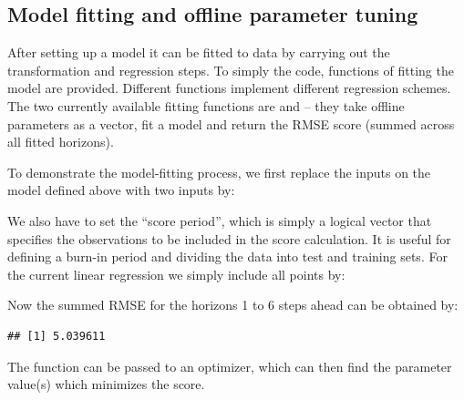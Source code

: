 \subsection{Model fitting and offline parameter tuning}

After setting up a model it can be fitted to data by carrying out the
transformation and regression steps. To simply the code, functions of fitting
the model are provided. Different functions implement different regression
schemes. The two currently available fitting functions are
 and  -- they take offline parameters as a
vector, fit a model and return the RMSE score (summed across all fitted horizons).

\noindent To demonstrate the model-fitting process, we first replace the inputs
on the model defined above with two inputs by:
\begin{knitrout}
\color{fgcolor}\begin{kframe}
\begin{alltt}
\hlopt{\$} \hlkwb{<-} 
\hlopt{\$}\hlstd{(} \hlstd{=} \hlstd{,}
                  \hlstd{=} \hlstd{)}
\end{alltt}
\end{kframe}
\end{knitrout}
\noindent We also have to set the ``score period'', which is simply a logical vector that
specifies the observations to be included in the score calculation. It is
useful for defining a burn-in period and dividing the data into test and training sets. For
the current linear regression we simply include all points by:
\begin{knitrout}
\color{fgcolor}\begin{kframe}
\begin{alltt}
\hlopt{\$} \hlkwb{<-} \hlstd{(}\hlstd{,} \hlopt{\$}
\end{alltt}
\end{kframe}
\end{knitrout}
\noindent Now the summed RMSE for the horizons 1 to 6 steps ahead can be
obtained by:
\begin{knitrout}
\color{fgcolor}\begin{kframe}
\begin{alltt}
\hlopt{\$} \hlkwb{<-} \hlopt{:}
\hlstd{(}\hlstd{(}\hlstd{=}  \hlstd{=}\hlstd{)}
\end{alltt}
\begin{verbatim}
## [1] 5.039611
\end{verbatim}
\end{kframe}
\end{knitrout}
\noindent The function can be passed to an optimizer, which can then find the
parameter value(s) which minimizes the score.

